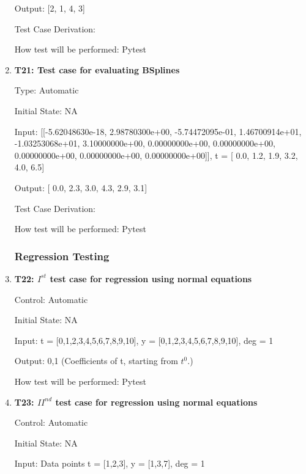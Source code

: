 \documentclass[12pt, titlepage]{article}
\begin{document}
\begin{enumerate}
Output: [2, 1, 4, 3]

Test Case Derivation: \cite{HermiteCubic2}

How test will be performed: Pytest

\item{\textbf{T21: Test case for evaluating BSplines}}

Type: Automatic

Initial State: NA 

Input: [[-5.62048630e-18, 2.98780300e+00, -5.74472095e-01,  1.46700914e+01,
-1.03253068e+01,  3.10000000e+00,  0.00000000e+00,  0.00000000e+00,
0.00000000e+00,  0.00000000e+00,  0.00000000e+00]], t = [ 0.0, 1.2,  1.9,  
3.2,  4.0,  6.5] 

Output: [ 0.0,  2.3,  3.0,  4.3,  2.9,  3.1]

Test Case Derivation: \cite{BSpline}

How test will be performed: Pytest







\subsubsection{Regression Testing}\label{ResgressionTesting}



\item{\textbf{T22: $I^{st}$ test case for regression using normal equations} \\}

Control: Automatic

Initial State: NA

Input: t = [0,1,2,3,4,5,6,7,8,9,10], y = [0,1,2,3,4,5,6,7,8,9,10], deg = 1 

Output: 0,1 (Coefficients of t, starting from $t^{0}$.)

How test will be performed: Pytest\\


\item{\textbf{T23: ${II}^{nd}$ test case for regression using normal 
equations}\\}

Control: Automatic

Initial State: NA

Input: Data points t = [1,2,3], y = [1,3,7], deg = 1


\end{enumerate}
\end{document}
